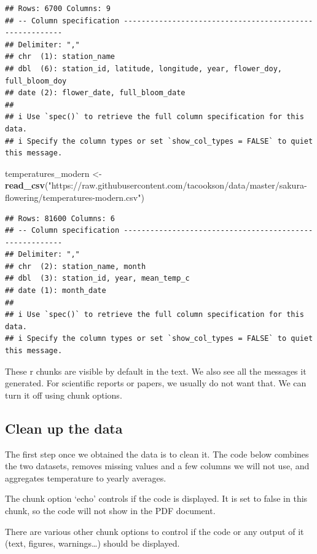 \documentclass[
  12pt,
]{article}
\newenvironment{Shaded}{\begin{snugshade}}{\end{snugshade}}
\newcommand{\FunctionTok}[1]{\textcolor[rgb]{0.13,0.29,0.53}{\textbf{#1}}}
\newcommand{\NormalTok}[1]{#1}
\newcommand{\OtherTok}[1]{\textcolor[rgb]{0.56,0.35,0.01}{#1}}
\newcommand{\StringTok}[1]{\textcolor[rgb]{0.31,0.60,0.02}{#1}}
\begin{document}
\begin{verbatim}
## Rows: 6700 Columns: 9
## -- Column specification --------------------------------------------------------
## Delimiter: ","
## chr  (1): station_name
## dbl  (6): station_id, latitude, longitude, year, flower_doy, full_bloom_doy
## date (2): flower_date, full_bloom_date
## 
## i Use `spec()` to retrieve the full column specification for this data.
## i Specify the column types or set `show_col_types = FALSE` to quiet this message.
\end{verbatim}

\begin{Shaded}
\begin{Highlighting}[]
\NormalTok{temperatures\_modern }\OtherTok{\textless{}{-}} \FunctionTok{read\_csv}\NormalTok{(}\StringTok{"https://raw.githubusercontent.com/tacookson/data/master/sakura{-}flowering/temperatures{-}modern.csv"}\NormalTok{)}
\end{Highlighting}
\end{Shaded}

\begin{verbatim}
## Rows: 81600 Columns: 6
## -- Column specification --------------------------------------------------------
## Delimiter: ","
## chr  (2): station_name, month
## dbl  (3): station_id, year, mean_temp_c
## date (1): month_date
## 
## i Use `spec()` to retrieve the full column specification for this data.
## i Specify the column types or set `show_col_types = FALSE` to quiet this message.
\end{verbatim}

These r chunks are visible by default in the text. We also see all the
messages it generated. For scientific reports or papers, we usually do
not want that. We can turn it off using chunk options.

\subsection{Clean up the data}\label{clean-up-the-data}

The first step once we obtained the data is to clean it. The code below
combines the two datasets, removes missing values and a few columns we
will not use, and aggregates temperature to yearly averages.

The chunk option `echo' controls if the code is displayed. It is set to
false in this chunk, so the code will not show in the PDF document.

There are various other chunk options to control if the code or any
output of it (text, figures, warnings\ldots) should be displayed.
\end{document}

